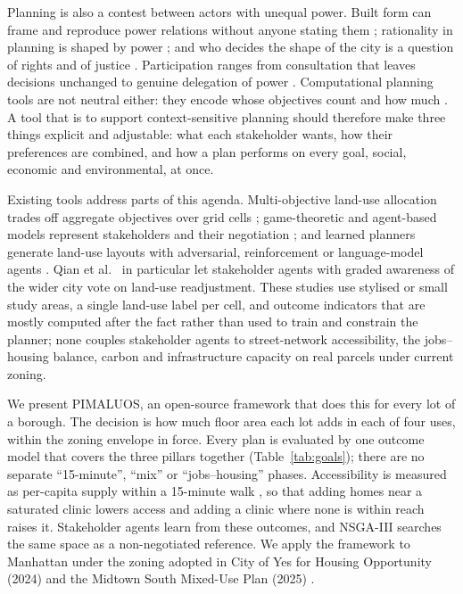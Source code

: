 \documentclass[preprint,12pt]{elsarticle}
\begin{document}
Planning is also a contest between actors with unequal power. Built form can frame and reproduce power relations without anyone stating them \cite{dovey1999framing}; rationality in planning is shaped by power \cite{flyvbjerg1998rationality}; and who decides the shape of the city is a question of rights \cite{harvey2008right} and of justice \cite{fainstein2010just}. Participation ranges from consultation that leaves decisions unchanged to genuine delegation of power \cite{arnstein1969ladder}. Computational planning tools are not neutral either: they encode whose objectives count and how much \cite{townsend2013smart}. A tool that is to support context-sensitive planning should therefore make three things explicit and adjustable: what each stakeholder wants, how their preferences are combined, and how a plan performs on every goal, social, economic and environmental, at once.

Existing tools address parts of this agenda. Multi-objective land-use allocation trades off aggregate objectives over grid cells \cite{stewart2004genetic,cao2011spatial,sicuaio2024sustainable}; game-theoretic and agent-based models represent stakeholders and their negotiation \cite{abolhasani2022collective}; and learned planners generate land-use layouts with adversarial, reinforcement or language-model agents \cite{wang2020reimagining,zheng2023spatial,qian2023aiagent,zhou2024llm}. Qian et al.\ \cite{qian2023aiagent} in particular let stakeholder agents with graded awareness of the wider city vote on land-use readjustment. These studies use stylised or small study areas, a single land-use label per cell, and outcome indicators that are mostly computed after the fact rather than used to train and constrain the planner; none couples stakeholder agents to street-network accessibility, the jobs--housing balance, carbon and infrastructure capacity on real parcels under current zoning.

We present PIMALUOS, an open-source framework that does this for every lot of a borough. The decision is how much floor area each lot adds in each of four uses, within the zoning envelope in force. Every plan is evaluated by one outcome model that covers the three pillars together (Table~\ref{tab:goals}); there are no separate ``15-minute'', ``mix'' or ``jobs--housing'' phases. Accessibility is measured as per-capita supply within a 15-minute walk \cite{luo2003measures}, so that adding homes near a saturated clinic lowers access and adding a clinic where none is within reach raises it. Stakeholder agents learn from these outcomes, and NSGA-III searches the same space as a non-negotiated reference. We apply the framework to Manhattan under the zoning adopted in City of Yes for Housing Opportunity (2024) and the Midtown South Mixed-Use Plan (2025) \cite{nyc_coy2024,nyc_msmx2025}.
\end{document}
